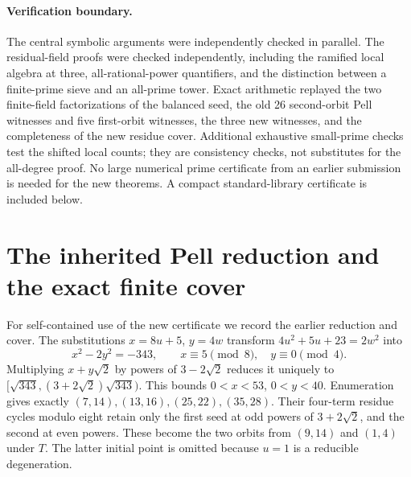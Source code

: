 \documentclass[11pt,a4paper]{article}
\theoremstyle{remark}\newtheorem{remark}[theorem]{Remark}
\begin{document}
\paragraph{Verification boundary.}
The central symbolic arguments were independently checked in
parallel. The residual-field proofs were checked independently,
including the ramified local algebra at three, all-rational-power
quantifiers, and the distinction between a finite-prime sieve and an
all-prime tower. Exact arithmetic replayed the two finite-field
factorizations of the balanced seed, the old 26 second-orbit Pell
witnesses and five first-orbit witnesses, the three new witnesses,
and the completeness of the new residue cover. Additional exhaustive
small-prime checks test the shifted local counts; they are consistency
checks, not substitutes for the all-degree proof. No large numerical
prime certificate from an earlier submission is needed for the new
theorems. A compact standard-library certificate is included below.

\appendix
\section{The inherited Pell reduction and the exact finite cover}
For self-contained use of the new certificate we record the earlier
reduction and cover. The substitutions $x=8u+5$, $y=4w$ transform
$4u^2+5u+23=2w^2$ into
\[
 x^2-2y^2=-343,\qquad x\equiv5\pmod8,\quad y\equiv0\pmod4.
\]
Multiplying $x+y\sqrt2$ by powers of $3-2\sqrt2$ reduces it uniquely
to $[\sqrt{343},(3+2\sqrt2)\sqrt{343})$. This bounds
$0<x<53$, $0<y<40$. Enumeration gives exactly
$(7,14),(13,16),(25,22),(35,28)$. Their four-term residue cycles
modulo eight retain only the first seed at odd powers of
$3+2\sqrt2$, and the second at even powers. These become the two
orbits from $(9,14)$ and $(1,4)$ under $T$. The latter initial point
is omitted because $u=1$ is a reducible degeneration.
\end{document}
